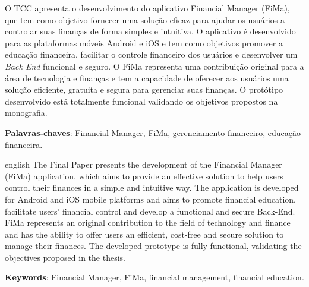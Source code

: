 
\setlength{\absparsep}{18pt} %
\begin{resumo}[Resumo]

O TCC apresenta o desenvolvimento do aplicativo Financial Manager (FiMa), que tem como objetivo fornecer uma solução eficaz para ajudar os usuários a controlar suas finanças de forma simples e intuitiva. O aplicativo é desenvolvido para as plataformas móveis Android e iOS e tem como objetivos promover a educação financeira, facilitar o controle financeiro dos usuários e desenvolver um \textit{Back End} funcional e seguro. O FiMa representa uma contribuição original para a área de tecnologia e finanças e tem a capacidade de oferecer aos usuários uma solução eficiente, gratuita e segura para gerenciar suas finanças. O protótipo desenvolvido está totalmente funcional validando os objetivos propostos na monografia.

 \textbf{Palavras-chaves}: Financial Manager, FiMa, gerenciamento financeiro, educação financeira.
\end{resumo}

\begin{resumo}[Abstract]
 \begin{otherlanguage*}{english}
  The Final Paper presents the development of the Financial Manager (FiMa) application, which aims to provide an effective solution to help users control their finances in a simple and intuitive way. The application is developed for Android and iOS mobile platforms and aims to promote financial education, facilitate users’ financial control and develop a functional and secure Back-End. FiMa represents an original contribution to the field of technology and finance and has the ability to offer users an efficient, cost-free and secure solution to manage their finances. The developed prototype is fully functional, validating the objectives proposed in the thesis.

   \vspace{\onelineskip}
 
   \noindent 
   \textbf{Keywords}: Financial Manager, FiMa, financial management, financial education.
 \end{otherlanguage*}
\end{resumo}